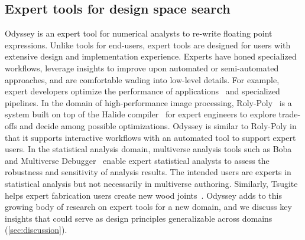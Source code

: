 \subsection{Expert tools for design space search}
Odyssey is an expert tool for numerical analysts to re-write floating point
expressions. Unlike tools for end-users, expert tools are designed for users
with extensive design and implementation experience. Experts have honed
specialized workflows, leverage insights to improve upon automated or
semi-automated approaches, and are comfortable wading into low-level details.
For example, expert developers optimize the performance of
applications~\cite{cito2018performanceHat} and specialized pipelines. In the
domain of high-performance image processing,
Roly-Poly~\cite{ikarashi2021guidedOptimization} is a system built on top of the
Halide compiler~\cite{ragan2013halide} for expert engineers to explore
trade-offs and decide among possible optimizations. Odyssey is similar to
Roly-Poly in that it supports interactive workflows with an automated tool to
support expert users. In the statistical analysis domain, multiverse analysis
tools such as Boba~\cite{liu2020boba} and Multiverse
Debugger~\cite{gu2023understanding} enable expert statistical analysts to assess
the robustness and sensitivity of analysis results. The intended users are
experts in statistical analysis but not necessarily in multiverse authoring.
Similarly, Tsugite helps expert fabrication users create new wood
joints~\cite{larsson2020tsugite}. Odyssey adds to this growing body of research
on expert tools for a new domain, and we discuss key insights that 
could serve as design principles generalizable across domains (\autoref{sec:discussion}).

